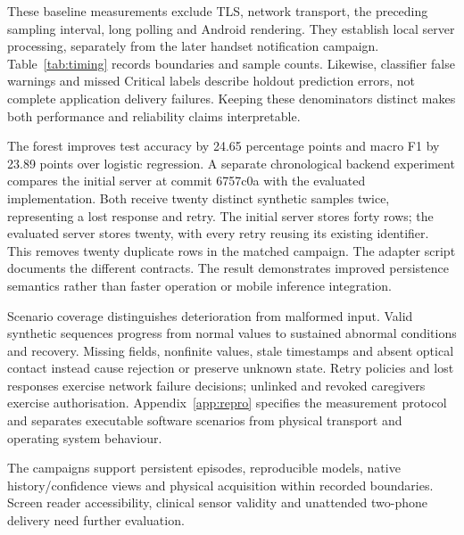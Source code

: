 \begin{reportprose}
These baseline measurements exclude TLS, network transport, the preceding sampling interval, long polling and Android rendering. They establish local server processing, separately from the later handset notification campaign. Table~\ref{tab:timing} records boundaries and sample counts. Likewise, classifier false warnings and missed Critical labels describe holdout prediction errors, not complete application delivery failures. Keeping these denominators distinct makes both performance and reliability claims interpretable.

The forest improves test accuracy by 24.65 percentage points and macro F1 by 23.89 points over logistic regression. A separate chronological backend experiment compares the initial server at commit 6757c0a with the evaluated implementation. Both receive twenty distinct synthetic samples twice, representing a lost response and retry. The initial server stores forty rows; the evaluated server stores twenty, with every retry reusing its existing identifier. This removes twenty duplicate rows in the matched campaign. The adapter script documents the different contracts. The result demonstrates improved persistence semantics rather than faster operation or mobile inference integration.\cite{improvement}

Scenario coverage distinguishes deterioration from malformed input. Valid synthetic sequences progress from normal values to sustained abnormal conditions and recovery. Missing fields, nonfinite values, stale timestamps and absent optical contact instead cause rejection or preserve unknown state. Retry policies and lost responses exercise network failure decisions; unlinked and revoked caregivers exercise authorisation. Appendix~\ref{app:repro} specifies the measurement protocol and separates executable software scenarios from physical transport and operating system behaviour.

The campaigns support persistent episodes, reproducible models, native history/confidence views and physical acquisition within recorded boundaries. Screen reader accessibility, clinical sensor validity and unattended two-phone delivery need further evaluation.
\end{reportprose}
\VerificationTable
\TimingTable

